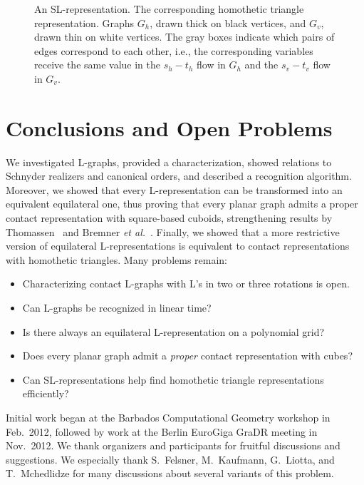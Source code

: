 \documentclass{llncs}
\begin{document}
 \begin{figure}[t!]
\centering
  \caption{ An SL-representation.  The corresponding homothetic triangle representation.  Graphs $G_h$, drawn thick on black vertices, and $G_v$, drawn thin on white vertices.
The gray boxes indicate which pairs of edges correspond to each other, i.e., the corresponding variables receive the same value in the $s_h-t_h$ flow in $G_h$ and the $s_v-t_v$ flow in $G_v$.}
  \label{fig:overconstrained}
 \end{figure}
 




\section{Conclusions and Open Problems}

We investigated L-graphs, provided a characterization, showed relations to Schnyder realizers and canonical orders, and described a recognition algorithm. Moreover, we showed that every L-representation can be transformed into an equivalent equilateral one, thus proving that every planar graph admits a proper contact representation with square-based cuboids, strengthening results by Thomassen~\cite{Thomassen86} and Bremner {\em et al.}~\cite{cubes12}. Finally, we showed that a more restrictive version of equilateral L-representations is equivalent to contact representations with homothetic triangles.
Many problems remain:
\begin{itemize}
 \item Characterizing contact L-graphs with L's in two or three rotations is open.
 \item Can L-graphs be recognized in linear time?
 \item Is there always an equilateral L-representation on a polynomial grid?
\item Does every planar graph admit a {\em proper} contact representation with cubes?
 \item Can SL-representations help find homothetic triangle representations efficiently?
\end{itemize}

\medskip
{} Initial work began at the Barbados Computational Geometry workshop in Feb.~2012, followed by work at the Berlin EuroGiga GraDR meeting in Nov.~2012. 
We thank organizers and participants for fruitful discussions and suggestions. We especially thank S.~Felsner, M.~Kaufmann, G.~Liotta, and T.~Mchedlidze for many discussions about several variants of this problem.


{

}
\end{document}
